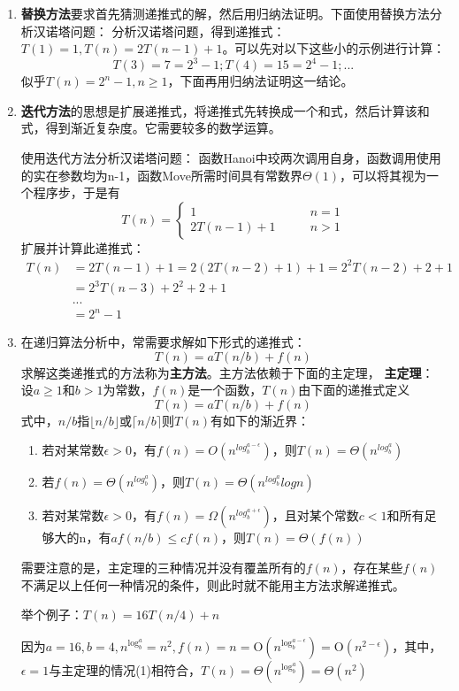 \begin{enumerate}
	\item \textbf{替换方法}要求首先猜测递推式的解，然后用归纳法证明。下面使用替换方法分析汉诺塔问题：
	分析汉诺塔问题，得到递推式：$T(1) = 1,T(n) = 2T(n-1) + 1$。可以先对以下这些小的示例进行计算：
	$$T(3) = 7 = 2^3 - 1; T(4) = 15 = 2^4 - 1; ...$$
	似乎$T(n) = 2^n - 1,n \geq 1$，下面再用归纳法证明这一结论。
	\item \textbf{迭代方法}的思想是扩展递推式，将递推式先转换成一个和式，然后计算该和式，得到渐近复杂度。它需要较多的数学运算。
	
	使用迭代方法分析汉诺塔问题：
	函数Hanoi中珓两次调用自身，函数调用使用的实在参数均为n-1，函数Move所需时间具有常数界$\Theta(1)$，可以将其视为一个程序步，于是有
	\begin{equation}
		T(n) = 
		\begin{cases} 
			1 \qquad &n = 1\\
			2T(n-1) + 1\qquad &n > 1 
		\end{cases}
	\end{equation}
	扩展并计算此递推式：
	\begin{equation}
		\begin{aligned}
			T(n) &= 2T(n-1) + 1 = 2(2T(n-2)+1)+1=2^2T(n-2)+2+1\\
			&=2^3T(n-3)+ 2^2 + 2 + 1 \\
			&...\\
			&=2^n - 1
		\end{aligned}
	\end{equation}
	\item 在递归算法分析中，常需要求解如下形式的递推式：
	\begin{equation}
		T(n) = aT(n/b) + f(n)
	\end{equation}
	求解这类递推式的方法称为\textbf{主方法}。主方法依赖于下面的主定理，
	\textbf{主定理}：设$a\geq 1$和$b>1$为常数，$f(n)$是一个函数，$T(n)$由下面的递推式定义
	\begin{equation}
		T(n) = aT(n/b) + f(n)
	\end{equation}
	式中，$n/b$指$\lfloor n/b \rfloor$或$\lceil n/b \rceil$则$T(n)$有如下的渐近界：
	\begin{enumerate}
		\item 若对某常数$\epsilon > 0$，有$f(n) = O(n^{log_b^{a - \epsilon}})$，则$T(n) = \Theta(n^{log_b^a})$
		\item 若$f(n) = \Theta(n^{log_b^a})$，则$T(n) = \Theta(n^{log_b^a}log n)$
		\item 若对某常数$\epsilon > 0$，有$f(n) = \Omega(n^{log_b^{a + \epsilon}})$，且对某个常数$c<1$和所有足够大的n，有$af(n/b) \leq cf(n)$，则$T(n) = \Theta (f(n))$
	\end{enumerate}
	需要注意的是，主定理的三种情况并没有覆盖所有的$f(n)$，存在某些$f(n)$不满足以上任何一种情况的条件，则此时就不能用主方法求解递推式。
	
	举个例子：$T(n)=16T(n/4)+n$
	
	因为$a=16,b=4,n^{\log_b^a}=n^2,f(n)=n=\mathrm{O}(n^{\log_b^{a-\epsilon}})=\mathrm{O}(n^{2-\epsilon})$，其中，$\epsilon=1$与主定理的情况(1)相符合，$T(n)=\Theta(n^{\log_b^a})=\Theta(n^2)$
\end{enumerate}

